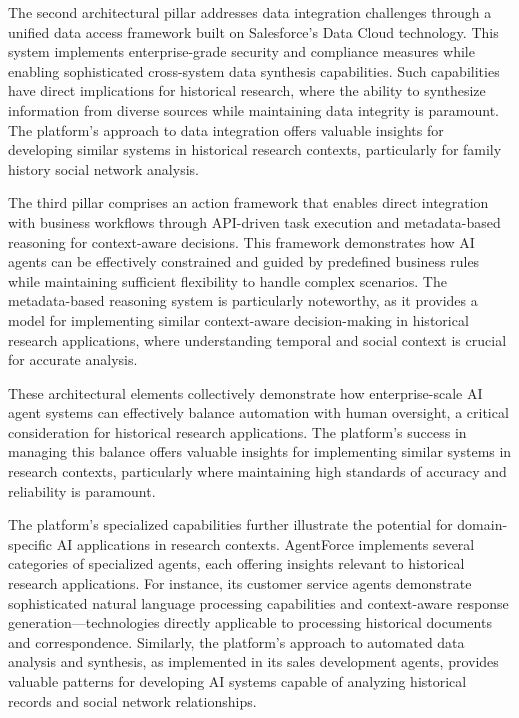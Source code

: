 \documentclass[
]{article}
\begin{document}
The second architectural pillar addresses data integration challenges
through a unified data access framework built on Salesforce's Data Cloud
technology. This system implements enterprise-grade security and
compliance measures while enabling sophisticated cross-system data
synthesis capabilities. Such capabilities have direct implications for
historical research, where the ability to synthesize information from
diverse sources while maintaining data integrity is paramount. The
platform's approach to data integration offers valuable insights for
developing similar systems in historical research contexts, particularly
for family history social network analysis.

The third pillar comprises an action framework that enables direct
integration with business workflows through API-driven task execution
and metadata-based reasoning for context-aware decisions. This framework
demonstrates how AI agents can be effectively constrained and guided by
predefined business rules while maintaining sufficient flexibility to
handle complex scenarios. The metadata-based reasoning system is
particularly noteworthy, as it provides a model for implementing similar
context-aware decision-making in historical research applications, where
understanding temporal and social context is crucial for accurate
analysis.

These architectural elements collectively demonstrate how
enterprise-scale AI agent systems can effectively balance automation
with human oversight, a critical consideration for historical research
applications. The platform's success in managing this balance offers
valuable insights for implementing similar systems in research contexts,
particularly where maintaining high standards of accuracy and
reliability is paramount.

The platform's specialized capabilities further illustrate the potential
for domain-specific AI applications in research contexts. AgentForce
implements several categories of specialized agents, each offering
insights relevant to historical research applications. For instance, its
customer service agents demonstrate sophisticated natural language
processing capabilities and context-aware response
generation---technologies directly applicable to processing historical
documents and correspondence. Similarly, the platform's approach to
automated data analysis and synthesis, as implemented in its sales
development agents, provides valuable patterns for developing AI systems
capable of analyzing historical records and social network
relationships.
\end{document}
